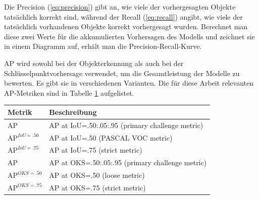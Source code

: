 Die Precision (\ref{eq:precision}) gibt an, wie viele der vorhergesagten Objekte tatsächlich korrekt sind, während der Recall (\ref{eq:recall}) angibt, wie viele der tatsächlich vorhandenen Objekte korrekt vorhergesagt wurden.
Berechnet man diese zwei Werte für die akkumulierten Vorhersagen des Modells und zeichnet sie in einem Diagramm auf, erhält man die Precision-Recall-Kurve.

AP wird sowohl bei der Objekterkennung als auch bei der Schlüsselpunktvorhersage verwendet, um die Gesamtleistung der Modelle zu bewerten. Es gibt sie in verschiedenen Varianten. Die für diese Arbeit relevanten AP-Metriken sind in Tabelle \ref{tab:AP} aufgelistet.
\begin{table}[h]
    \centering
    \begin{tabular}{ll}
        \toprule
        \textbf{Metrik}                 & \textbf{Beschreibung}                               \\
        \midrule
        $\text{AP}$                & AP at IoU=.50:.05:.95 (primary challenge metric)      \\
        $\text{AP}^{IoU=.50}$                & AP at IoU=.50 (PASCAL VOC metric)                     \\
        $\text{AP}^{IoU=.75}$                & AP at IoU=.75 (strict metric)                         \\
        $\text{AP}$                       & AP at OKS=.50:.05:.95 (primary challenge metric)      \\
        $\text{AP}^{OKS=.50}$                & AP at OKS=.50 (loose metric)                          \\
        $\text{AP}^{OKS=.75}$                & AP at OKS=.75 (strict metric)                         \\
        \bottomrule
    \end{tabular}
    \label{tab:AP}
\end{table}

